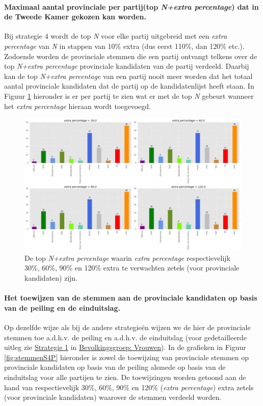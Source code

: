 \paragraph{Maximaal aantal provinciale per partij(top \textit{N+extra percentage}) dat in de Tweede Kamer gekozen kan worden.} 
Bij strategie 4 wordt de top \textit{N} voor elke partij uitgebreid met een \textit{extra percentage} van \textit{N} in stappen van 10\% extra (dus eerst 110\%, dan 120\% etc.). Zodoende worden de provinciale stemmen die een partij ontvangt telkens over de top \textit{N+extra percentage} provinciale kandidaten van de partij verdeeld. Daarbij kan de top \textit{N+extra percentage} van een partij nooit meer worden dat het totaal aantal provinciale kandidaten dat de partij op de kandidatenlijst heeft staan. In Figuur \ref{fig:NexpP} hieronder is er per partij te zien wat er met de top \textit{N} gebeurt wanneer het \textit{extra percentage} hieraan wordt toegevoegd.  


\begin{figure}[H]

	\includegraphics[width=\linewidth]{topN_vermenigvuldiging_provincialen.png}

			\caption{De top \textit{N+extra percentage} waarin \textit{extra percentage} respectievelijk 30\%, 60\%, 90\% en 120\% extra te verwachten zetels (voor provinciale kandidaten) zijn.}

\label{fig:NexpP}
\end{figure}




\paragraph{Het toewijzen van de stemmen aan de provinciale kandidaten op basis van de peiling en de einduitslag.}
Op dezelfde wijze als bij de andere strategie\"{e}n wijzen we de hier de provinciale stemmen toe a.d.h.v. de peiling en a.d.h.v. de einduitslag (voor gedetailleerde uitleg zie \hyperref[S1V]{Strategie 1} in \hyperref[vrouwen]{Bevolkingsgroep: Vrouwen}). In de grafieken in Figuur \ref{fig:stemmenS4P} hieronder is zowel de toewijzing van provinciale stemmen op provinciale kandidaten op basis van de peiling alsmede op basis van de einduitslag voor alle partijen te zien. De toewijzingen worden getoond aan de hand van respectievelijk 30\%, 60\%, 90\% en 120\% (\textit{extra percentage}) extra zetels (voor provinciale kandidaten) waarover de stemmen verdeeld worden.

